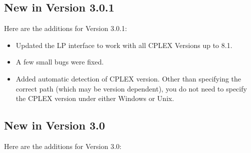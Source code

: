 
\subsection{New in Version 3.0.1}

Here are the additions for Version 3.0.1:

\begin{itemize}

\item Updated the LP interface to work with all CPLEX Versions up to 8.1.

\item A few small bugs were fixed.

\item Added automatic detection of CPLEX version. Other than specifying the
correct path (which may be version dependent), you do not need to specify the
CPLEX version under either Windows or Unix.

\end{itemize}

\subsection{New in Version 3.0}

Here are the additions for Version 3.0:

